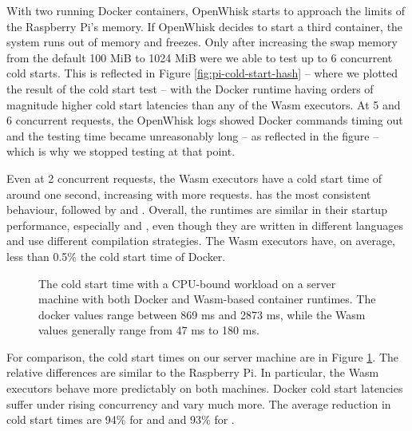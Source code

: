 With two running Docker containers, OpenWhisk starts to approach the limits of the Raspberry Pi's memory. If OpenWhisk decides to start a third container, the system runs out of memory and freezes. Only after increasing the swap memory from the default 100 MiB to 1024 MiB were we able to test up to 6 concurrent cold starts.
This is reflected in Figure \ref{fig:pi-cold-start-hash} -- where we plotted the result of the cold start test -- with the Docker runtime having orders of magnitude higher cold start latencies than any of the Wasm executors. At 5 and 6 concurrent requests, the OpenWhisk logs showed Docker commands timing out and the testing time became unreasonably long -- as reflected in the figure -- which is why we stopped testing at that point.

Even at 2 concurrent requests, the Wasm executors have a cold start time of around one second, increasing with more requests.  has the most consistent behaviour, followed by  and . Overall, the runtimes are similar in their startup performance, especially  and , even though they are written in different languages and use different compilation strategies. The Wasm executors have, on average, less than 0.5\% the cold start time of Docker.


\begin{figure}
    \begin{center}
        
    \end{center}
    \caption{The cold start time with a CPU-bound workload on a server machine with both Docker and Wasm-based container runtimes. The docker values range between 869 ms and 2873 ms, while the Wasm values generally range from 47 ms to 180 ms.}
    \label{fig:pc-cold-start-hash}
\end{figure}

For comparison, the cold start times on our  server machine are in Figure \ref{fig:pc-cold-start-hash}. The relative differences are similar to the Raspberry Pi. In particular, the Wasm executors behave more predictably on both machines. Docker cold start latencies suffer under rising concurrency and vary much more.
The average reduction in cold start times are 94\% for  and  and 93\% for .

